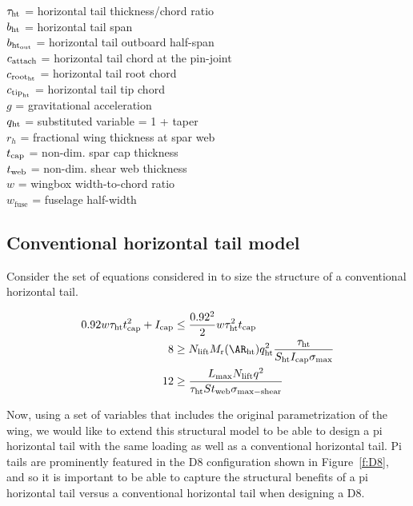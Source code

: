 \begin{tabbing}
$\tau_{\rm{ht}}$ = horizontal tail thickness/chord ratio \\
$b_{\rm{ht}}$ = horizontal tail span \\
$b_{\rm{ht}_{\rm{out}}}$ = horizontal tail outboard half-span\\
$c_{\rm{attach}}$ = horizontal tail chord at the pin-joint \\
$c_{\rm{root}_{\rm{ht}}}$ = horizontal tail root chord \\
$c_{\rm{tip}_{\rm{ht}}}$ = horizontal tail tip chord \\
$g$ = gravitational acceleration \\
$q_{\rm{ht}}$ = substituted variable = 1 + taper \\
$r_h$ = fractional wing thickness at spar web \\
$t_{\rm{cap}}$ = non-dim. spar cap thickness \\
$t_{\rm{web}}$ = non-dim. shear web thickness \\
$w$ = wingbox width-to-chord ratio \\
$w_{\textrm{fuse}}$ = fuselage half-width \\
\end{tabbing}

\subsection{Conventional horizontal tail model}

Consider the set of equations considered in \cite{SP_ac_design} to size
the structure of a conventional horizontal tail. 

\begin{align}
\label{e:HTorig}
\begin{split}
    0.92 w\tau_{\rm{ht}} t_{\rm{cap}}^2 + I_{\rm{cap}} &\leq \frac{0.92^2}{2}w\tau_{\rm{ht}}^2t_{\rm{cap}}\\
    8 &\geq N_{\rm{lift}}M_{\rm{r}}(\AR_{\rm{ht}})q_{\rm{ht}}^2\frac{\tau_{\rm{ht}}}{S_{\rm{ht}} I_{\rm{cap}}\sigma_{\rm{max}}}\\
    12 &\geq \frac{L_{\rm{max}} N_{\rm{lift}} q^2}{\tau_{\rm{ht}} S t_{\rm{web}} \sigma_{\rm{max-shear}}}
\end{split}
\end{align}

Now, using a set of variables that includes the original parametrization of the wing, 
we would like to extend this structural model to be able to design a pi horizontal tail
with the same loading as well as a conventional horizontal tail. Pi tails are prominently
featured in the D8 configuration shown in Figure~\ref{f:D8}, and so it is important to
be able to capture the structural benefits of a pi horizontal tail versus a conventional
horizontal tail when designing a D8.

